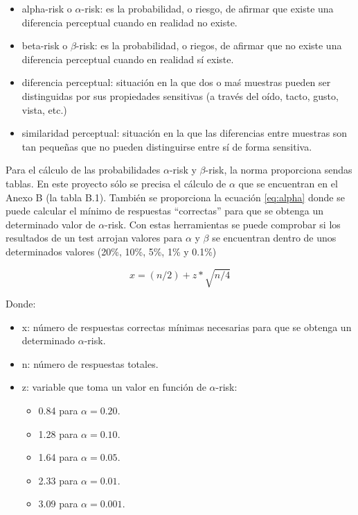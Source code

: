 \documentclass[11pt,a4paper]{book}
\begin{document}
            \begin{itemize}
                \item alpha-risk o $\alpha$-risk: es la probabilidad, o riesgo, de afirmar que existe una diferencia perceptual cuando en realidad no existe.
                \item beta-risk o $\beta$-risk: es la probabilidad, o riegos, de afirmar que no existe una diferencia perceptual cuando en realidad sí existe.
                \item diferencia perceptual: situación en la que dos o maś muestras pueden ser distinguidas por sus propiedades sensitivas (a través del oído, tacto, gusto, vista, etc.)
                \item similaridad perceptual: situación en la que las diferencias entre muestras son tan pequeñas que no pueden distinguirse entre sí de forma sensitiva.
            \end{itemize}
            Para el cálculo de las probabilidades $\alpha$-risk y $\beta$-risk, la norma proporciona sendas tablas. En este proyecto sólo se precisa el cálculo de $\alpha$ que se encuentran en el Anexo B  (la tabla B.1). También se proporciona la ecuación \ref{eq:alpha} donde se puede calcular el mínimo de respuestas ``correctas'' para que se obtenga un determinado valor de $\alpha$-risk. Con estas herramientas se puede comprobar si los resultados de un test arrojan valores para $\alpha$ y $\beta$ se encuentran dentro de unos determinados valores (20\%, 10\%, 5\%, 1\% y 0.1\%)
            
            \begin{equation}
                x=(n/2)+z*\sqrt{n/4}
                \label{eq:alpha}
            \end{equation}
            
            Donde:
            \begin{itemize}
                \item x: número de respuestas correctas mínimas necesarias para que se obtenga un determinado $\alpha$-risk.
                \item n: número de respuestas totales.
                \item z: variable que toma un valor en función de $\alpha$-risk:
                \begin{itemize}
                    \item 0.84 para $\alpha=0.20$.
                    \item 1.28 para $\alpha=0.10$.
                    \item 1.64 para $\alpha=0.05$.
                    \item 2.33 para $\alpha=0.01$.
                    \item 3.09 para $\alpha=0.001$.
                    
                \end{itemize}
            \end{itemize}
            
\end{document}
